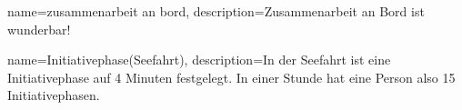 {
    name={zusammenarbeit an bord},
    description={Zusammenarbeit an Bord ist wunderbar!}
}

{
    name=Initiativephase(Seefahrt),
    description={In der Seefahrt ist eine Initiativephase auf 4 Minuten festgelegt. In einer Stunde hat eine Person also 15 Initiativephasen.}
}
